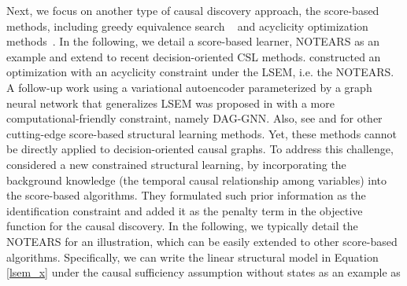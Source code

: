 
    





Next, we focus on another type of causal discovery approach, the score-based methods, including greedy equivalence search ~\citep{chickering2002optimal,ramsey2017million,huang2018generalized} and acyclicity optimization methods~\citep{zheng2018dags,yu2019dag,zhu2019causal,lachapelle2019gradient,cai2020anoce,zheng2020learning,vowels2021d}. In the following, we detail a score-based learner, NOTEARS \citep{zheng2018dags} as an example and extend to recent decision-oriented \acrshort{CSL} methods.  \citet{zheng2018dags}  constructed an optimization with an acyclicity constraint under the \acrshort{LSEM}, i.e. the NOTEARS. A follow-up work using a variational autoencoder parameterized by a graph neural network that generalizes \acrshort{LSEM} was proposed in \citet{yu2019dag} with a more computational-friendly constraint, namely DAG-GNN. Also, see \citet{zhu2019causal} and \citet{lachapelle2019gradient} for other cutting-edge score-based structural learning methods. Yet, these methods cannot be directly applied to decision-oriented causal graphs.
To address this challenge, \citet{cai2020anoce}
considered a new constrained structural learning, by incorporating the background knowledge (the temporal causal relationship among variables) into the score-based algorithms. They formulated such prior information as the identification constraint and added it as the penalty term in the objective function for the causal discovery. In the following, we typically detail the NOTEARS for an illustration, which can be easily extended to other score-based algorithms. Specifically, we can write the linear structural model in Equation \eqref{lsem_x} under the causal sufficiency assumption without states as an example as
